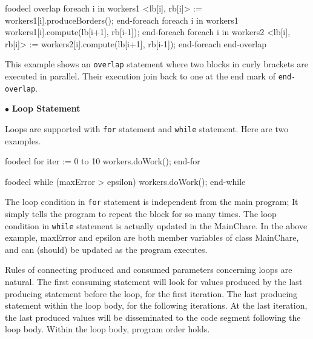 \documentclass[10pt]{article}
\def\smallfbox#1{{\small \fbox{#1}}}
\def\code#1{{\small {\tt {#1}}}}
\begin{document}
\begin{SaveVerbatim}{foodecl}
  overlap
  {
    foreach i in workers1
      <lb[i], rb[i]> := workers1[i].produceBorders();
    end-foreach
    foreach i in workers1
      workers1[i].compute(lb[i+1], rb[i-1]);
    end-foreach
  }
  {
    foreach i in workers2
      <lb[i], rb[i]> := workers2[i].compute(lb[i+1], rb[i-1]);
    end-foreach
  }
  end-overlap
\end{SaveVerbatim}
\vspace{0.1in}
\smallfbox{\BUseVerbatim{foodecl}}
\vspace{0.1in}

This example shows an \code{overlap} statement where two blocks in curly
brackets are executed in parallel. Their execution join back to one at the end
mark of \code{end-overlap}. 

$\bullet$ {\bf Loop Statement}

Loops are supported with \code{for} statement and \code{while} statement. Here
are two examples.
\begin{SaveVerbatim}{foodecl}
  for iter := 0 to 10
     workers.doWork();
  end-for
\end{SaveVerbatim}
\vspace{0.1in}
\smallfbox{\BUseVerbatim{foodecl}}
\vspace{0.1in}
  
\begin{SaveVerbatim}{foodecl}
  while (maxError > epsilon)
     workers.doWork();
  end-while
\end{SaveVerbatim}
\vspace{0.1in}
\smallfbox{\BUseVerbatim{foodecl}}
\vspace{0.1in}

The loop condition in \code{for} statement is independent from the main program;
It simply tells the program to repeat the block for so many times. The loop
condition in \code{while} statement is actually updated in the MainChare. In the
above example, maxError and epsilon are both member variables of class
MainChare, and can (should) be updated as the program executes. 

Rules of connecting produced and consumed parameters concerning loops are
natural. The first consuming statement will look for values produced by the last
producing statement before the loop, for the first iteration. The last
producing statement within the loop body, for the following iterations. At the
last iteration, the last produced values will be disseminated to the code
segment following the loop body. Within the loop body, program order holds. 
\end{document}
